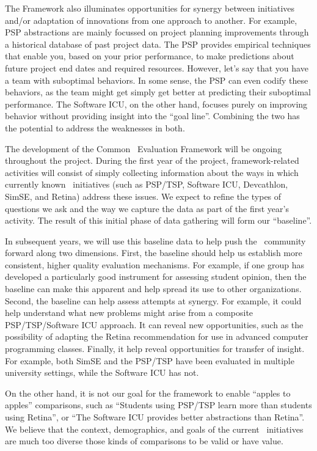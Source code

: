 The Framework also illuminates opportunities for synergy between
initiatives and/or adaptation of innovations from one approach to another.
For example, PSP abstractions are mainly focussed on project planning
improvements through a historical database of past project data. The PSP
provides empirical techniques that enable you, based on your prior
performance, to make predictions about future project end dates and
required resources.  However, let's say that you have a team with
suboptimal behaviors.  In some sense, the PSP can even codify these
behaviors, as the team might get simply get better at predicting their
suboptimal performance.  The Software ICU, on the other hand, focuses purely 
on improving behavior without providing insight into the ``goal line''.  
Combining the two has the potential to address the weaknesses in both. 

The development of the Common \eCT\ Evaluation Framework will be ongoing
throughout the project.  During the first year of the project,
framework-related activities will consist of simply collecting information
about the ways in which currently known \eCT\ initiatives (such as PSP/TSP,
Software ICU, Devcathlon, SimSE, and Retina) address these issues.   We expect to 
refine the types of questions we ask and the way we capture the data as
part of the first year's activity. The result of this initial phase of data
gathering will form our ``baseline''. 

In subsequent years, we will use this baseline data to help push the \eCT\
community forward along two dimensions. First, the baseline should help us
establish more consistent, higher quality evaluation mechanisms. For
example, if one group has developed a particularly good instrument for
assessing student opinion, then the baseline can make this apparent and
help spread its use to other organizations.  Second, the baseline can
help assess attempts at synergy.  For example, it could help understand what 
new problems might arise from a composite PSP/TSP/Software ICU approach. 
It can reveal new opportunities, such as the possibility of adapting the 
Retina recommendation for use in advanced computer programming classes. 
Finally, it help reveal opportunities for transfer of insight. For example, 
both SimSE and the PSP/TSP have been evaluated in multiple university settings, 
while the Software ICU has not. 

On the other hand, it is not our goal for the framework to enable ``apples
to apples'' comparisons, such as ``Students using PSP/TSP learn more than
students using Retina'', or ``The Software ICU provides better abstractions
than Retina''.  We believe that the context, demographics, and goals of the
current \eCT\ initiatives are much too diverse those kinds of comparisons
to be valid or have value.



